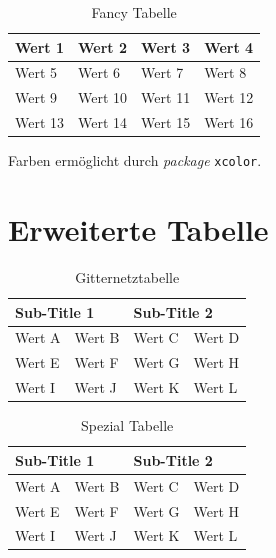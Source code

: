 \documentclass{scrreprt}
\begin{document}
\begin{table}[h!]
	\centering
	\caption{Fancy Tabelle}
	\label{my-label}
	\begin{tabular}{llll}
		Wert 1  & Wert 2                          & Wert 3                          & Wert 4  \\ \hline
		Wert 5  & \cellcolor[HTML]{329A9D}Wert 6  & \cellcolor[HTML]{329A9D}Wert 7  & Wert 8  \\ \hline
		Wert 9  & \cellcolor[HTML]{329A9D}Wert 10 & \cellcolor[HTML]{329A9D}Wert 11 & Wert 12 \\ \hline
		Wert 13 & Wert 14                         & Wert 15                         & Wert 16 \\ \hline
	\end{tabular}
\end{table}

Farben ermöglicht durch \textit{package} \texttt{xcolor}.

\section{Erweiterte Tabelle}

\begin{table}[htbp]
	\caption{Gitternetztabelle}
	\label { Tabelle 1.0}
	\centering
	\begin{tabular}{|l|l|l|l|}
		\hline
		\multicolumn{2}{|l|}{Sub-Title 1} & \multicolumn{2}{l|}{Sub-Title 2} \\ \hline
		Wert A          & Wert B          & Wert C          & Wert D         \\ \hline
		Wert E          & Wert F          & Wert G          & Wert H         \\ \hline
		Wert I          & Wert J          & Wert K          & Wert L         \\ \hline
	\end{tabular}
\end{table}

\begin{table}[h!]

\centering
\caption{Spezial Tabelle}
\label{my-label}
	
\begin{tabular}{|l|l|l|l|}

\hline
\multicolumn{2}{|l|}{Sub-Title 1} & \multicolumn{2}{l|}{Sub-Title 2} \\ \hline
Wert A          & Wert B          & Wert C          & Wert D         \\ \hline
Wert E          & Wert F          & Wert G          & Wert H         \\ \hline
Wert I          & Wert J          & Wert K          & Wert L         \\ \hline
\end{tabular}
\end{table}
\newpage
\end{document}
